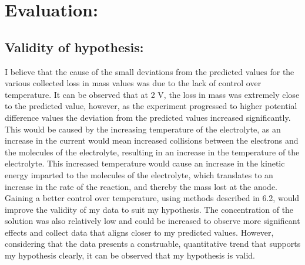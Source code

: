 \documentclass[11pt, a4]{article}
\begin{document}
	\section{Evaluation:}
		\subsection{Validity of hypothesis:}
			I believe that the cause of the small deviations from the predicted values for the various collected loss in mass values was due to the lack of control over temperature. It can be observed that at 2 V, the loss in mass was extremely close to the predicted value, however, as the experiment progressed to higher potential difference values the deviation from the predicted values increased significantly. This would be caused by the increasing temperature of the electrolyte, as an increase in the current would mean increased collisions between the electrons and the molecules of the electrolyte, resulting in an increase in the temperature of the electrolyte. This increased temperature would cause an increase in the kinetic energy imparted to the molecules of the electrolyte, which translates to an increase in the rate of the reaction, and thereby the mass lost at the anode. Gaining a better control over temperature, using methods described in 6.2, would improve the validity of my data to suit my hypothesis. The concentration of the solution was also relatively low and could be increased to observe more significant effects and collect data that aligns closer to my predicted values. However, considering that the data presents a construable, quantitative trend that supports my hypothesis clearly, it can be observed that my hypothesis is valid. 
			\newpage
\end{document}
